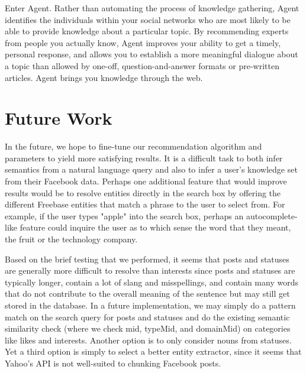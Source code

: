 \documentclass[11pt]{article}
\begin{document}
Enter Agent. Rather than automating the process of knowledge gathering, Agent
identifies the individuals within your social networks who are most likely to be
able to provide knowledge about a particular topic. By recommending experts
from people you actually know, Agent improves your ability to get a timely,
personal response, and allows you to establish a more meaningful dialogue about
a topic than allowed by one-off, question-and-answer formats or pre-written
articles. Agent brings you knowledge through the web.






\section{Future Work}
\label{sec:future}
In the future, we hope to fine-tune our recommendation algorithm and parameters
to yield more satisfying results. It is a difficult task to both infer semantics from
a natural language query and also to infer a user's knowledge set from their
Facebook data. Perhaps one additional feature that would improve results would be
to resolve entities directly in the search box by offering the different Freebase
entities that match a phrase to the user to select from. For example, if the user
types "apple" into the search box, perhaps an autocomplete-like feature could
inquire the user as to which sense the word that they meant, the fruit or the technology
company.

Based on the brief testing that we performed, it seems that posts and statuses are
generally more difficult to resolve than interests since posts and statuses are typically
longer, contain a lot of slang and misspellings, and contain many words that do not
contribute to the overall meaning of the sentence but may still get stored in the
database. In a future implementation, we may simply do a pattern match on the
search query for posts and statuses and do the existing semantic similarity check
(where we check mid, typeMid, and domainMid) on categories like likes and interests.
Another option is to only consider nouns from statuses. Yet a third option is simply to
select a better entity extractor, since it seems that Yahoo's API is not well-suited to
chunking Facebook posts.
\end{document}
